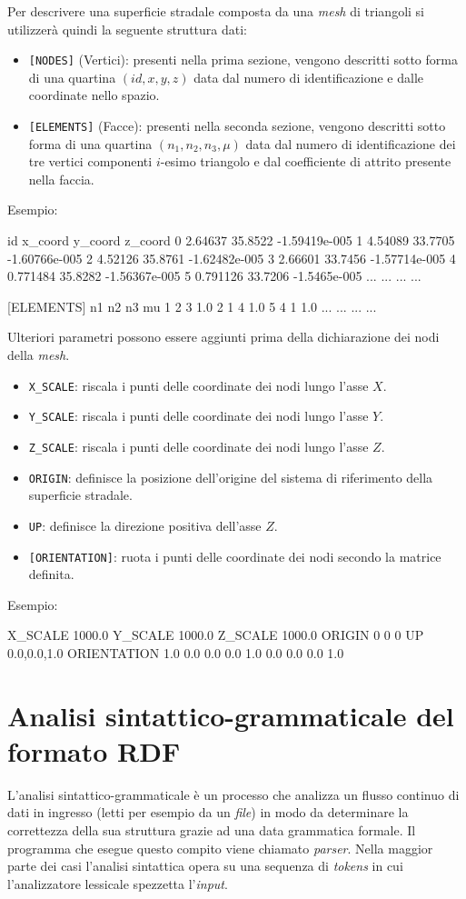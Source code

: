 Per descrivere una superficie stradale composta da una \textit{mesh} di triangoli si utilizzerà quindi la seguente struttura dati:
\begin{itemize}
	\item \texttt{[NODES]} (Vertici): presenti nella prima sezione, vengono descritti sotto forma di una quartina $(id,x,y,z)$ data dal numero di identificazione e dalle coordinate nello spazio.
	\item \texttt{[ELEMENTS]} (Facce): presenti nella seconda sezione, vengono descritti sotto forma di una quartina $(n_1,n_2,n_3,\mu)$ data dal numero di identificazione dei tre vertici componenti $i$-esimo triangolo e dal coefficiente di attrito presente nella faccia.
\end{itemize}
Esempio:
\begin{pseudoc}
	[NODES]
	{ id x_coord y_coord z_coord }
	0 2.64637 35.8522 -1.59419e-005 
	1 4.54089 33.7705 -1.60766e-005 
	2 4.52126 35.8761 -1.62482e-005 
	3 2.66601 33.7456 -1.57714e-005 
	4 0.771484 35.8282 -1.56367e-005 
	5 0.791126 33.7206 -1.5465e-005
	... ... ... ...
	
	[ELEMENTS]
	{ n1 n2 n3 mu }
	1 2 3 1.0 
	2 1 4 1.0 
	5 4 1 1.0 
	... ... ... ...
\end{pseudoc}
Ulteriori parametri possono essere aggiunti prima della dichiarazione dei nodi della \textit{mesh}.
\begin{itemize}
	\item \texttt{X\_SCALE}: riscala i punti delle coordinate dei nodi lungo l'asse $X$.
	\item \texttt{Y\_SCALE}: riscala i punti delle coordinate dei nodi lungo l'asse $Y$.
	\item \texttt{Z\_SCALE}: riscala i punti delle coordinate dei nodi lungo l'asse $Z$.
	\item \texttt{ORIGIN}: definisce la posizione dell'origine del sistema di riferimento della superficie stradale.
	\item \texttt{UP}: definisce la direzione positiva dell'asse $Z$.
	\item \texttt{[ORIENTATION]}: ruota i punti delle coordinate dei nodi secondo la matrice definita.
\end{itemize}
Esempio:
\begin{pseudoc}
	X_SCALE
	1000.0
	Y_SCALE
	1000.0
	Z_SCALE
	1000.0
	ORIGIN
	0 0 0
	UP
	0.0,0.0,1.0
	ORIENTATION
	1.0  0.0  0.0
	0.0  1.0  0.0
	0.0  0.0  1.0
\end{pseudoc}
%
\section{Analisi sintattico-grammaticale del formato RDF}
%
L'analisi sintattico-grammaticale è un processo che analizza un flusso continuo di dati in ingresso (letti per esempio da un \textit{file}) in modo da determinare la correttezza della sua struttura grazie ad una data grammatica formale. Il programma che esegue questo compito viene chiamato \textit{parser}. Nella maggior parte dei casi l'analisi sintattica opera su una sequenza di \textit{tokens} in cui l'analizzatore lessicale spezzetta l'\textit{input}.

